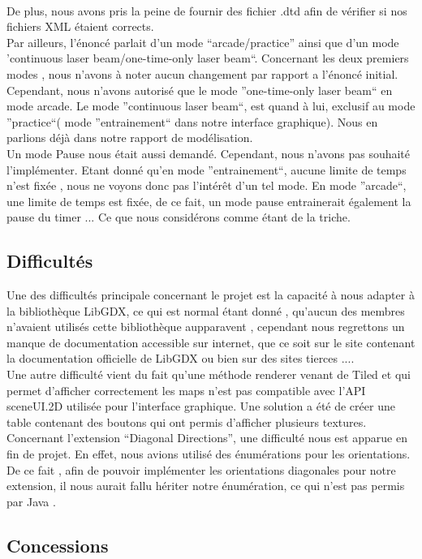 \documentclass[a4paper,10pt]{article}
\begin{document}
\\
De plus, nous avons pris la peine de fournir des fichier .dtd afin de vérifier si nos fichiers XML étaient corrects.
\\
Par ailleurs, l'énoncé parlait d'un mode ``arcade/practice'' ainsi que d'un mode 'continuous laser beam/one-time-only laser beam``. Concernant les
deux premiers modes , nous n'avons à noter aucun changement par rapport a l'énoncé initial. Cependant, nous n'avons autorisé que le mode ''one-time-only laser beam``
en mode arcade. Le mode ''continuous laser beam``, est quand à lui, exclusif au mode ''practice``( mode ''entrainement`` dans notre interface graphique).
Nous en parlions déjà dans notre rapport de modélisation.
\\
Un mode Pause nous était aussi demandé. Cependant, nous n'avons pas souhaité l'implémenter. Etant donné qu'en mode ''entrainement``, aucune limite de
temps n'est fixée , nous ne voyons donc pas l'intérêt d'un tel mode. En mode ''arcade``, une limite de temps est fixée, de ce fait, un mode pause entrainerait
également la pause du timer ... Ce que nous considérons comme étant de la triche.

\subsection{Difficultés}
Une des difficultés principale concernant le projet est la capacité à nous adapter à la bibliothèque LibGDX, ce qui est normal étant donné , qu'aucun des membres
n'avaient utilisés cette bibliothèque aupparavent , cependant nous regrettons un manque de documentation accessible sur internet, que ce soit sur 
le site contenant la documentation officielle de LibGDX  ou bien sur des sites tierces ....
\\
Une autre difficulté vient du fait qu'une méthode renderer venant de Tiled et qui permet d'afficher correctement les maps n'est pas compatible avec
l'API sceneUI.2D utilisée pour l'interface graphique. Une solution a été de créer une table contenant des boutons qui ont permis d'afficher plusieurs
textures.
\\
Concernant l'extension ``Diagonal Directions'', une difficulté nous est apparue en fin de projet. En effet, nous avions utilisé des énumérations pour
les orientations. De ce fait , afin de pouvoir implémenter les orientations diagonales pour notre extension, il nous aurait fallu hériter notre énumération,
 ce qui n'est pas permis par Java .
\subsection{Concessions}
\end{document}
